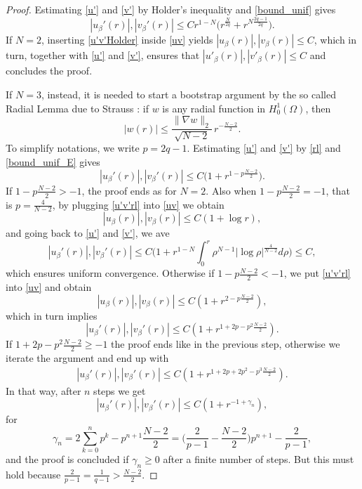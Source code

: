 \documentclass[reqno]{amsart}
\begin{document}
\begin{proof}
Estimating \eqref{u'} and \eqref{v'} by Holder's inequality and \eqref{bound_unif} gives
\begin{equation} \label{u'v'Holder}
|u_{\beta}'(r)|, | v_{\beta}'(r)|
\le C r^{1-N} \Big(r^{\frac{N}{2q}} + r^{N\frac{2q-1}{2q}} \Big) .
\end{equation}
If $N=2$,  inserting \eqref{u'v'Holder} inside \eqref{uv} yields
$|u_{\beta}(r)|, | v_{\beta}(r)|\le C$, which in turn, together with \eqref{u'}
and \eqref{v'},
ensures that $|u'_{\beta}(r)|, | v'_{\beta}(r)|\le C$ and concludes the proof.

If $N= 3$, instead, it is needed to start a bootstrap argument by the so called Radial
Lemma due to Strauss \cite{strauss}: if $w$ is any radial function in $H^1_0(\Omega)$,
then
\begin{equation} \label{rl}
|w(r)|\le \frac{\|\nabla w\|_{2} }{\sqrt{N-2}} \, r^{-\frac{N-2}2}.
\end{equation}
To simplify notations, we write $p=2q-1$.
Estimating \eqref{u'} and \eqref{v'} by \eqref{rl} and \eqref{bound_unif_E} gives
\begin{equation} \label{u'v'rl}
 |u_{\beta}'(r)|, | v_{\beta}'(r)|\le C \Big( 1+ r^{1-p\frac{N-2}{2}} \Big) .
\end{equation}
 If $1-p\frac{N-2}{2} >-1$, the proof ends as for  $N=2$.
Also when $1-p\frac{N-2}{2} =-1$, that is $p= \frac{4}{N-2}$, by
 plugging \eqref{u'v'rl} into \eqref{uv} we obtain
\[
|u_{\beta}(r)|, | v_{\beta}(r)|\le C \left( 1+ \log r\right) ,
\]
and going back to \eqref{u'} and \eqref{v'}, we ave
\[
|u_{\beta}'(r)|, | v_{\beta}'(r)|
\le C  \Big(1+ r^{1-N}\int_0^r \rho^{N-1} |\log\rho|^{\frac4{N-2}}d\rho \Big) \le C ,
\]
which ensures uniform convergence.
Otherwise if $1-p\frac{N-2}{2} <-1$, we put \eqref{u'v'rl} into \eqref{uv} and obtain
\begin{equation} \label{uvrl}
|u_{\beta}(r)|, | v_{\beta}(r)|\le C \left( 1+ r^{2-p\frac{N-2}{2}} \right) ,
\end{equation}
which in turn implies
\[
|u_{\beta}'(r)|, | v_{\beta}'(r)|\le C \left( 1+ r^{1+2p -p^2\frac{N-2}{2}} \right) .
\]
If $1+2p -p^2\frac{N-2}{2} \ge -1$ the proof ends like in the previous step,
 otherwise we iterate the argument  and end up with
\begin{align*}%
|u_{\beta}'(r)|, | v_{\beta}'(r)|\le C \left( 1+ r^{1+2p +2p^2-p^3\frac{N-2}{2}} \right) . \end{align*}
In that way, after $n$ steps we get
\[
|u_{\beta}'(r)|, | v_{\beta}'(r)|\le C \left( 1+ r^{-1+\gamma_n} \right) ,
\]
for
\[
\gamma_n= 2\sum_{k=0}^n p^k-p^{n+1}\frac{N-2}{2}
= \Big(\frac{2}{p-1} - \frac{N-2}{2} \Big) p^{n+1}-  \frac{2}{p-1} ,
\]
and the proof is concluded if $\gamma_n\ge 0$  after a finite number of steps.
But this must hold because $\frac{2}{p-1} = \frac{1}{q-1} >  \frac{N-2}{2}$.
\end{proof}
\end{document}
